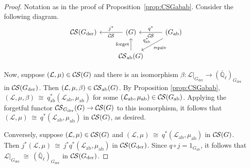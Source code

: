 \documentclass[10pt]{amsart}
\theoremstyle{plain}
\theoremstyle{definition}
\newcommand{\EE}{\mathbb{\bar Q}_\ell}
\newcommand{\der}{_{\operatorname{der}}}
\newcommand{\ab}{_{\operatorname{ab}}}
\newcommand{\iso}{{\ \cong\ }}
\newcommand{\cs}[1]{{\mathcal{#1}}}
\newcommand{\CS}{{\mathcal{C\hskip-0.8pt S}}}
\newcommand{\CSab}{\CS_{\operatorname{ab}}}
\begin{document}
\begin{proof}
Notation as in the proof of Proposition~\ref{prop:CSGabab}.
Consider the following diagram.
\[
\begin{tikzcd}
\CS(G\der) & \arrow{l}[swap]{j^*} \CS(G) &\arrow{l}[swap]{q^*} 
\CS(G\ab) \arrow{dl}{\text{equiv}}[swap]{q\ab^*} \\
& \CSab(G) \arrow{u}{\text{forget}}  & 
\end{tikzcd}
\]

Now, suppose $(\cs{L},\mu)\in \CS(G)$ and there is an isomorphism $\beta : \cs{L}\vert_{G\der} \to (\EE)_{G\der}$ in $\CS(G\der)$.
Then $(\cs{L},\mu,\beta) \in \CSab(G)$.
By Proposition \ref{prop:CSGabab}, $(\cs{L},\mu,\beta) \iso q\ab^*(\cs{L}\ab,\mu\ab)$ for some $(\cs{L}\ab,\mu\ab)\in \CS(G\ab)$.
Applying the forgetful functor $\CS_{G\der}(G)\to \CS(G)$ to this isomorphism, it follows that $(\cs{L},\mu) \iso q^*(\cs{L}\ab,\mu\ab)$ in $\CS(G)$, as desired. 

Conversely, suppose $(\cs{L},\mu)\in \CS(G)$ and $(\cs{L},\mu) \iso q^*(\cs{L}\ab,\mu\ab)$ in $\CS(G)$.
Then $j^*(\cs{L},\mu) \iso j^*q^*(\cs{L}\ab,\mu\ab)$ in $\CS(G\der)$. 
Since $q\circ j = 1_{G\ab}$, it follows that $\cs{L}\vert_{G\der} \iso (\EE)_{G\der}$ in $\CS(G\der)$.
\end{proof}
\end{document}
